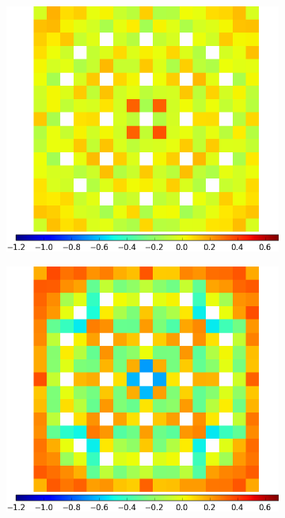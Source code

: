 \begin{figure}[h!]
\begin{subfigure}{0.45\textwidth}
  \caption{}
  \label{fig:chap11-assm-1.6-capt-degenerate}
\end{subfigure}
\begin{subfigure}{0.45\textwidth}
  \centering
  \includegraphics[width=\linewidth]{figures/results/assm-16/no-transform/capt-err-lns}
  \caption{}
  \label{fig:chap11-assm-1.6-capt-lns}
\end{subfigure}%
\begin{subfigure}{0.45\textwidth}
  \centering
  \includegraphics[width=\linewidth]{figures/results/assm-16/no-transform/capt-err-pinch-agglomerative-(2)}

\end{subfigure}
\end{figure}
